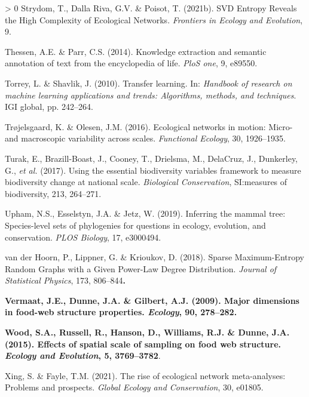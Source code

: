 \documentclass[11pt]{article}
\makeatletter
\def\maxwidth{\ifdim\Gin@nat@width>\linewidth\linewidth
\else\Gin@nat@width\fi}
\let\Oldincludegraphics\includegraphics
\renewcommand{\includegraphics}[1]{\Oldincludegraphics[width=\maxwidth]{#1}}
\newlength{\cslhangindent}
\newenvironment{CSLReferences}[3] %
 {%
  \setlength{\parindent}{0pt}
  \ifodd #1 \everypar{\setlength{\hangindent}{\cslhangindent}}\ignorespaces\fi
  \ifnum #2 > 0
  \setlength{\parskip}{#2\baselineskip}
  \fi
 }%
 {}
\providecommand{\DIFaddtex}[1]{{\bf #1}} %
\providecommand{\DIFaddbegin}{\protect\color{blue}} %
\providecommand{\DIFaddend}{\protect\color{black}} %
\providecommand{\DIFadd}[1]{\texorpdfstring{\DIFaddtex{#1}}{#1}} %
\newcommand{\DIFaddincludegraphics}[2][]{{\color{blue}\fbox{\DIFOincludegraphics[#1]{#2}}}} %
\DeclareRobustCommand{\DIFaddbegin}{\DIFOaddbegin \let\includegraphics\DIFaddincludegraphics} %
\DeclareRobustCommand{\DIFaddend}{\DIFOaddend \let\includegraphics\DIFOincludegraphics} %
\makeatother
\begin{document}
\begin{CSLReferences}{1}{0}
\leavevmode\hypertarget{ref-Strydom2021SvdEnt}{}%
Strydom, T., Dalla Riva, G.V. \& Poisot, T. (2021b). SVD Entropy Reveals
the High Complexity of Ecological Networks. \emph{Frontiers in Ecology
and Evolution}, 9.

\leavevmode\hypertarget{ref-Thessen2014KnoExt}{}%
Thessen, A.E. \& Parr, C.S. (2014). Knowledge extraction and semantic
annotation of text from the encyclopedia of life. \emph{PloS one}, 9,
e89550.

\leavevmode\hypertarget{ref-Torrey2010TraLea}{}%
Torrey, L. \& Shavlik, J. (2010). Transfer learning. In: \emph{Handbook
of research on machine learning applications and trends: Algorithms,
methods, and techniques}. IGI global, pp. 242--264.

\leavevmode\hypertarget{ref-Trojelsgaard2016EcoNet}{}%
Trøjelsgaard, K. \& Olesen, J.M. (2016). Ecological networks in motion:
Micro- and macroscopic variability across scales. \emph{Functional
Ecology}, 30, 1926--1935.

\leavevmode\hypertarget{ref-Turak2017UsiEss}{}%
Turak, E., Brazill-Boast, J., Cooney, T., Drielsma, M., DelaCruz, J.,
Dunkerley, G., \emph{et al.} (2017). Using the essential biodiversity
variables framework to measure biodiversity change at national scale.
\emph{Biological Conservation}, SI:measures of biodiversity, 213,
264--271.

\leavevmode\hypertarget{ref-Upham2019InfMam}{}%
Upham, N.S., Esselstyn, J.A. \& Jetz, W. (2019). Inferring the mammal
tree: Species-level sets of phylogenies for questions in ecology,
evolution, and conservation. \emph{PLOS Biology}, 17, e3000494.

\leavevmode\hypertarget{ref-vanderHoorn2018SpaMax}{}%
van der Hoorn, P., Lippner, G. \& Krioukov, D. (2018). Sparse
Maximum-Entropy Random Graphs with a Given Power-Law Degree
Distribution. \emph{Journal of Statistical Physics}, 173, 806--844\DIFaddbegin \DIFadd{.
}

\leavevmode\hypertarget{ref-Vermaat2009MajDim}{}%
\DIFadd{Vermaat, J.E., Dunne, J.A. \& Gilbert, A.J. (2009). Major dimensions in
food-web structure properties. \emph{Ecology}, 90, 278--282.
}

\leavevmode\hypertarget{ref-Wood2015EffSpa}{}%
\DIFadd{Wood, S.A., Russell, R., Hanson, D., Williams, R.J. \& Dunne, J.A.
(2015). Effects of spatial scale of sampling on food web structure.
\emph{Ecology and Evolution}, 5, 3769--3782}\DIFaddend .

\leavevmode\hypertarget{ref-Xing2021RisEco}{}%
Xing, S. \& Fayle, T.M. (2021). The rise of ecological network
meta-analyses: Problems and prospects. \emph{Global Ecology and
Conservation}, 30, e01805.


\end{CSLReferences}
\end{document}
